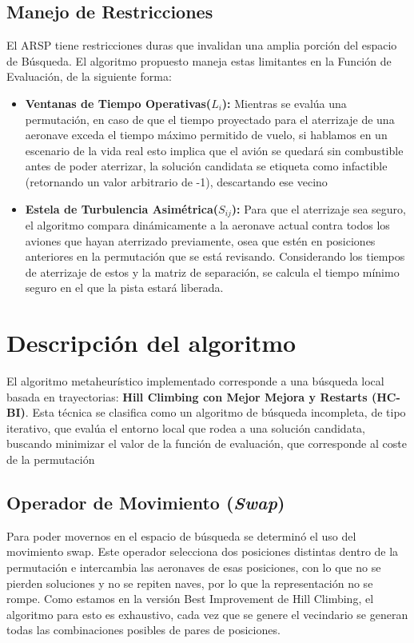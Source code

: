 \documentclass[letter, 10pt]{article}
\begin{document}
\subsection{Manejo de Restricciones}
El ARSP tiene restricciones duras que invalidan una amplia porción del espacio de Búsqueda. El algoritmo propuesto maneja estas limitantes en la Función de Evaluación, de la siguiente forma:
\begin{itemize}
    \item \textbf{Ventanas de Tiempo Operativas($L_i$):} Mientras se evalúa una permutación, en caso de que el tiempo proyectado para el aterrizaje de una aeronave exceda el tiempo máximo permitido de vuelo, si hablamos en un escenario de la vida real esto implica que el avión se quedará sin combustible antes de poder aterrizar, la solución candidata se etiqueta como infactible (retornando un valor arbitrario de -1), descartando ese vecino
    \item \textbf{Estela de Turbulencia Asimétrica($S_{ij}$):} Para que el aterrizaje sea seguro, el algoritmo compara dinámicamente a la aeronave actual contra todos los aviones que hayan aterrizado previamente, osea que estén en posiciones anteriores en la permutación que se está revisando. Considerando los tiempos de aterrizaje de estos y la matriz de separación, se calcula  el tiempo mínimo seguro en el que la pista estará liberada.
\end{itemize}

\section{Descripci\'on del algoritmo}
El algoritmo metaheurístico implementado corresponde a una búsqueda local basada en trayectorias: \textbf{Hill Climbing con Mejor Mejora y Restarts (HC-BI)}. Esta técnica se clasifica como un algoritmo de búsqueda incompleta, de tipo iterativo, que evalúa el entorno local que rodea a una solución candidata, buscando minimizar el valor de la función de evaluación, que corresponde al coste de la permutación

\subsection{Operador de Movimiento (\textit{Swap})}
Para poder movernos en el espacio de búsqueda se determinó el uso del movimiento swap. Este operador selecciona dos posiciones distintas dentro de la permutación e intercambia las aeronaves de esas posiciones, con lo que no se pierden soluciones y no se repiten naves, por lo que la representación no se rompe. Como estamos en la versión Best Improvement de Hill Climbing, el algoritmo para esto es exhaustivo, cada vez que se genere el vecindario se generan todas las combinaciones posibles de pares de posiciones.
\end{document}
